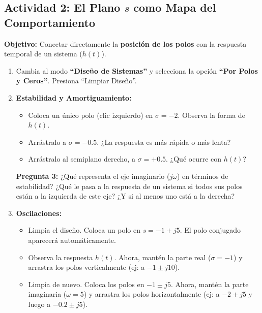\documentclass[12pt, a4paper]{article}
\begin{document}
\vspace{1cm}

\begin{framed}
\subsection*{Actividad 2: El Plano $s$ como Mapa del Comportamiento}
\textbf{Objetivo:} Conectar directamente la \textbf{posición de los polos} con la respuesta temporal de un sistema ($h(t)$).

\begin{enumerate}[label=\textbf{\arabic*.}]
    \item Cambia al modo \textbf{``Diseño de Sistemas''} y selecciona la opción \textbf{``Por Polos y Ceros''}. Presiona ``Limpiar Diseño''.
    
    \item \textbf{Estabilidad y Amortiguamiento:}
        \begin{itemize}
            \item Coloca un único polo (clic izquierdo) en $\sigma = -2$. Observa la forma de $h(t)$.
            \item Arrástralo a $\sigma = -0.5$. ¿La respuesta es más rápida o más lenta?
            \item Arrástralo al semiplano derecho, a $\sigma = +0.5$. ¿Qué ocurre con $h(t)$?
        \end{itemize}
    
    \textbf{Pregunta 3:} ¿Qué representa el eje imaginario ($j\omega$) en términos de estabilidad? ¿Qué le pasa a la respuesta de un sistema si todos sus polos están a la izquierda de este eje? ¿Y si al menos uno está a la derecha?
    
    \vspace{2cm}
    
    \item \textbf{Oscilaciones:}
        \begin{itemize}
            \item Limpia el diseño. Coloca un polo en $s = -1 + j5$. El polo conjugado aparecerá automáticamente.
            \item Observa la respuesta $h(t)$. Ahora, mantén la parte real ($\sigma = -1$) y arrastra los polos verticalmente (ej: a $-1 \pm j10$).
            \item Limpia de nuevo. Coloca los polos en $-1 \pm j5$. Ahora, mantén la parte imaginaria ($\omega = 5$) y arrastra los polos horizontalmente (ej: a $-2 \pm j5$ y luego a $-0.2 \pm j5$).
        \end{itemize}
        

\end{enumerate}
\end{framed}
\end{document}
